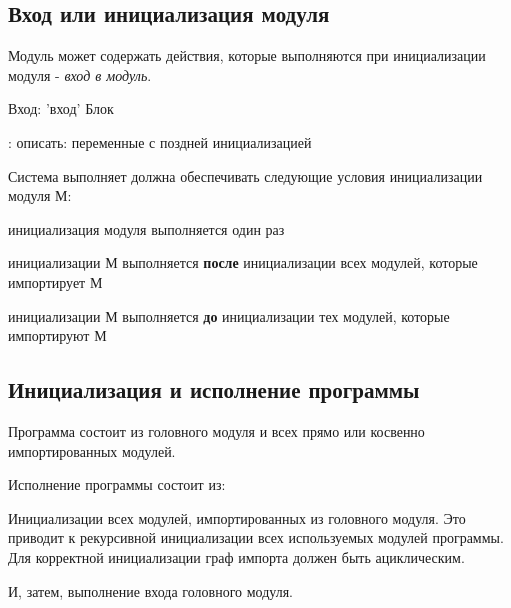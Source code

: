 \hypertarget{entry}{%
\subsection{Вход или инициализация модуля}\label{mods:entry}}

Модуль может содержать действия, которые выполняются при инициализации модуля - \emph{вход в модуль}. 

\begin{Trivil}
Вход: 'вход' Блок
\end{Trivil}

\TBD: описать: переменные с поздней инициализацией
\bigskip

Система выполняет должна обеспечивать следующие условия инициализации модуля М:
\begin{d_itemize}
\item
    инициализация модуля выполняется один раз
\item
    инициализации М выполняется \textbf{после} инициализации всех модулей, которые импортирует М
\item
    инициализации М выполняется \textbf{до} инициализации тех модулей, которые импортируют М
\end{d_itemize}

\hypertarget{execution}{%
\subsection{Инициализация и исполнение программы}\label{mods:execution}}

Программа состоит из головного модуля и всех прямо или косвенно импортированных модулей.

Исполнение программы состоит из:
\begin{d_itemize}
\item
    Инициализации всех модулей, импортированных из головного модуля. Это приводит к рекурсивной инициализации всех используемых модулей
    программы. Для корректной инициализации граф импорта должен быть ациклическим.
\item
    И, затем, выполнение входа головного модуля.
\end{d_itemize}

